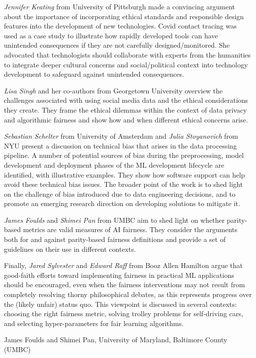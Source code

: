 \documentclass[11pt]{article}
\begin{document}
\textit{Jennifer Keating} from University of Pittsburgh made a convincing argument about the importance of incorporating ethical standards and responsible design features into the development of new technologies. Covid contact tracing was used as a case study to illustrate how rapidly developed tools can have unintended consequences if they are not carefully designed/monitored. She advocated that technologists should collaborate with experts from the humanities to integrate deeper cultural concerns and social/political context into technology development to safeguard against unintended consequences.

\textit{Lisa Singh} and her co-authors from Georgetown University overview the challenges associated with using social media data and the ethical considerations they create.  They frame the ethical dilemmas within the context of data privacy and algorithmic fairness and show how and when different ethical concerns arise.  

\textit{Sebastian Schelter} from University of Amsterdam and \textit{Julia Stoyanovich}  from NYU present a discussion on technical bias that arises in the data processing pipeline.  A number of potential sources of bias during the preprocessing, model development and deployment phases of the ML development lifecycle are identified, with illustrative examples.  They  show how software support can help avoid these technical bias issues.  The broader point of the work is to shed light on the challenge of bias introduced due to data engineering decisions, and to promote an emerging research direction on developing solutions to mitigate it.

\textit{James Foulds} and \textit{Shimei Pan} from UMBC  aim to shed light on whether parity-based metrics are valid measures of AI fairness. They consider the arguments both for and against parity-based fairness definitions and provide a set of guidelines on their use in different contexts. 

Finally, \textit{Jared Sylvester} and \textit{Edward Raff} from Booz Allen Hamilton argue that good-faith efforts toward implementing fairness in practical ML applications should be encouraged, even when the fairness interventions may not result from completely resolving thorny philosophical debates, as this represents progress over the (likely unfair) status quo.  This viewpoint is discussed in several contexts: choosing the right fairness metric, solving trolley problems for self-driving cars, and selecting hyper-parameters for fair learning algorithms.

\begin{flushright}
James Foulds and Shimei Pan, University of Maryland, Baltimore County (UMBC)
\end{flushright}
\end{document}
